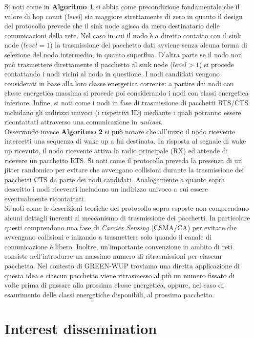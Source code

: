 \documentclass[binding=0.6cm,TFA]{sapthesis}
\begin{document}
Si noti come in \textbf{Algoritmo 1} si abbia come precondizione fondamentale che il valore di hop count (\emph{level}) sia maggiore strettamente
di zero in quanto il design del protocollo prevede che il sink node agisca da mero destinatario delle comunicazioni della rete. Nel caso in cui
il nodo è a diretto contatto con il sink node ($level=1$) la trasmissione del pacchetto dati avviene senza alcuna forma di
selezione del nodo intermedio, in quanto superflua. D'altra parte se il nodo non può trasmettere direttamente il pacchetto al sink node ($level>1$)
si procede contattando i nodi vicini al nodo in questione. I nodi candidati vengono considerati in base alla loro classe energetica corrente:
a partire dai nodi con classe energetica massima si procede poi considerando i nodi con classi energetica inferiore. Infine, si noti come i nodi in fase
di trasmissione di pacchetti RTS/CTS includano gli indirizzi univoci (i rispettivi ID) mediante i quali potranno essere ricontattati attraverso una
comunicazione in \emph{unicast}.\\

Osservando invece \textbf{Algoritmo 2} si può notare che all'inizio il nodo ricevente intercetti una sequenza di wake up a lui destinata. In risposta
al segnale di wake up ricevuto, il nodo ricevente attiva la radio principale (RX) ed attende di ricevere un pacchetto RTS. Si noti come il
protocollo preveda la presenza di un jitter randomico per evitare che avvengano collisioni durante la trasmissione dei pacchetti CTS da parte
dei nodi candidati. Analogamente a quanto sopra descritto i nodi riceventi includono un indirizzo univoco a cui essere eventualmente ricontattati.\\

Si noti come le descrizioni teoriche del protocollo sopra esposte non comprendano alcuni dettagli inerenti al meccanismo di trasmissione
dei pacchetti. In particolare questi comprendono una fase di \emph{Carrier Sensing} (CSMA/CA) per evitare che avvengano collisioni e
inizando a trasmettere solo quando il canale di comunicazione è libero. Inoltre, un'importante convenzione in ambito di reti consiste
nell'introdurre un massimo numero di ritrasmissioni per ciascun pacchetto. Nel contesto di GREEN-WUP troviamo una diretta applicazione di questa
idea e ciascun pacchetto viene ritrasmesso al più un numero fissato di volte prima di passare alla prossima classe energetica, oppure, nel caso
di esaurimento delle classi energetiche disponibili, al prossimo pacchetto.

\section{Interest dissemination}
\end{document}

